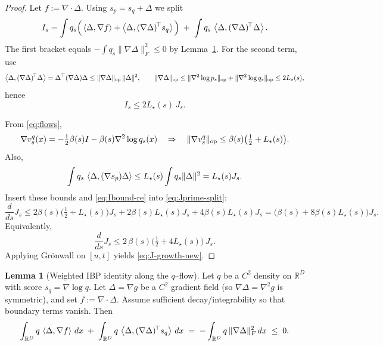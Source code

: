 \documentclass[12pt]{article}
\theoremstyle{definition} %
\newtheorem{lemma}{Lemma}
\newcommand{\R}{\mathbb{R}}
\begin{document}
\begin{proof}
Let $f:=\nabla\!\cdot\Delta$. Using $s_p=s_q+\Delta$ we split
\[
I_s
=
\int q_s\Big(\left\langle \Delta,\nabla f \right\rangle+\left\langle \Delta,(\nabla\Delta)^{\!\top}s_q \right\rangle\Big)
\;+\;
\int q_s\,\left\langle \Delta,(\nabla\Delta)^{\!\top}\Delta \right\rangle.
\]
The first bracket equals $-\int q_s\|\nabla\Delta\|_F^2\le 0$ by Lemma~\ref{lem:IBP-q}.
For the second term, use
\[
\left\langle \Delta,(\nabla\Delta)^{\!\top}\Delta \right\rangle
=\Delta^\top(\nabla\Delta)\Delta
\le \|\nabla\Delta\|_{\rm op}\,\|\Delta\|^2,
\qquad
\|\nabla\Delta\|_{\rm op}
\le \|\nabla^2\log p_s\|_{\rm op}+\|\nabla^2\log q_s\|_{\rm op}
\le 2L_\star(s),
\]
hence
\begin{equation}\label{eq:Ibound-re}
I_s\le 2L_\star(s)\,J_s.
\end{equation}

From \eqref{eq:flows},
\[
\nabla v_s^q(x)= -\tfrac12\beta(s)I - \beta(s)\nabla^2\log q_s(x)
\quad\Rightarrow\quad
\|\nabla v_s^q\|_{\rm op}\le \beta(s)\big(\tfrac12+L_\star(s)\big).
\]
Also,
\[
\int q_s\,\left\langle \Delta,(\nabla s_p)\Delta \right\rangle\le L_\star(s)\int q_s\|\Delta\|^2=L_\star(s)J_s.
\]
Insert these bounds and \eqref{eq:Ibound-re} into \eqref{eq:Jprime-split}:
\[
\frac{d}{ds}J_s
\le 2\beta(s)\big(\tfrac12+L_\star(s)\big)J_s
+2\beta(s)L_\star(s)J_s
+4\beta(s)L_\star(s)J_s
=\big(\beta(s)+8\beta(s)L_\star(s)\big)J_s.
\]
Equivalently,
\[
\frac{d}{ds}J_s\le 2\,\beta(s)\big(\tfrac12+4L_\star(s)\big)\,J_s.
\]
Applying Gr\"onwall on $[u,t]$ yields \eqref{eq:J-growth-new}.
\end{proof}

\begin{lemma}[Weighted IBP identity along the $q$--flow]\label{lem:IBP-q}
Let $q$ be a $C^2$ density on $\R^D$ with score $s_q=\nabla\log q$.
Let $\Delta=\nabla g$ be a $C^2$ gradient field (so $\nabla\Delta=\nabla^2 g$ is symmetric), and set
$f:=\nabla\!\cdot\Delta$.
Assume sufficient decay/integrability so that boundary terms vanish.
Then
\begin{equation}\label{eq:IBP-q}
\int_{\R^D} q\,\ip{\Delta}{\nabla f}\,dx
\;+\;
\int_{\R^D} q\,\ip{\Delta}{(\nabla\Delta)^{\!\top} s_q}\,dx
\;=\;
-\int_{\R^D} q\,\|\nabla\Delta\|_F^2\,dx
\;\le\;0.
\end{equation}
\end{lemma}
\end{document}
